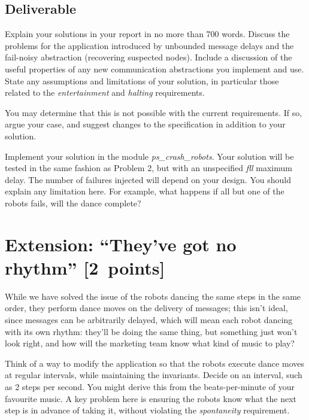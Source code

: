 \documentclass[a4paper]{article}
\begin{document}


\subsection*{Deliverable} %
\label{sub:p3_deliverable}

Explain your solutions in your report in no more than 700 words.
Discuss the problems for the application introduced by unbounded message
delays and the fail-noisy abstraction (recovering suspected nodes).
Include a discussion of the useful properties of any new
communication abstractions you implement and use.
State any assumptions and limitations of your solution, in particular those
related to the \emph{entertainment} and \emph{halting} requirements.

You may determine that this is not possible with the
current requirements. If so, argue your case, and suggest changes to the
specification in addition to your solution.

Implement your solution in the module \emph{ps\_crash\_robots}.
Your solution will be tested in the same fashion as Problem 2, but with
an unspecified \emph{fll} maximum delay. The number of failures injected will
depend on your design. You should explain any limitation here. For example,
what happens if all but one of the robots fails, will the dance complete?












\section*{Extension: ``They've got no rhythm'' [2~points]} %
\label{sec:buffered_dance_routine}

While we have solved the issue of the robots dancing the same steps in the
same order, they perform dance moves on the delivery of messages; this isn't
ideal, since messages can be arbitrarily delayed, which will mean each robot
dancing with its own rhythm: they'll be doing the same thing, but something
just won't look right, and how will the marketing team know what kind of music
to play?

Think of a way to modify the application so that the robots execute dance
moves at regular intervals, while maintaining the invariants. Decide on an
interval, such as 2 steps per second. You might derive this from the
beats-per-minute of your favourite music. A key problem here is ensuring the
robots know what the next step is in advance of taking it, without violating
the \emph{spontaneity} requirement.
\end{document}
